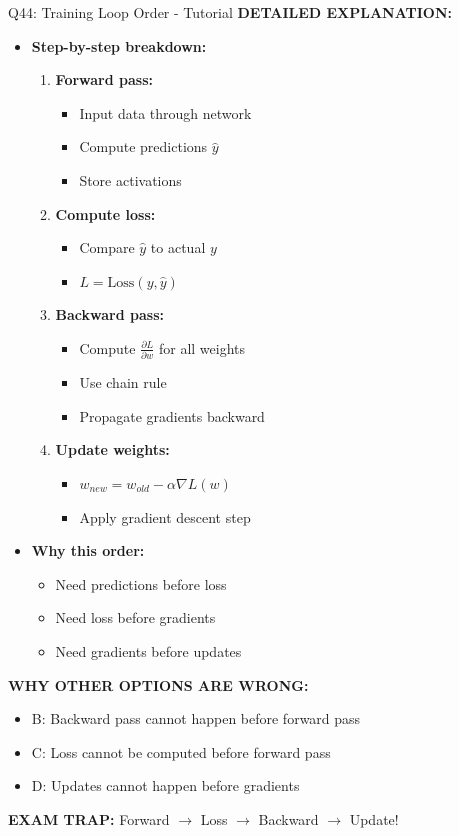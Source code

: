 \documentclass[8pt]{beamer}
\begin{document}
\begin{frame}{Q44: Training Loop Order - Tutorial}
		\vspace{0.05cm}
		\textbf{DETAILED EXPLANATION:}
		\begin{itemize}
			\item \textbf{Step-by-step breakdown:}
			\begin{enumerate}
				\item \textbf{Forward pass:}
				\begin{itemize}
					\item Input data through network
					\item Compute predictions $\hat{y}$
					\item Store activations
				\end{itemize}
				\item \textbf{Compute loss:}
				\begin{itemize}
					\item Compare $\hat{y}$ to actual $y$
					\item $L = \text{Loss}(y, \hat{y})$
				\end{itemize}
				\item \textbf{Backward pass:}
				\begin{itemize}
					\item Compute $\frac{\partial L}{\partial w}$ for all weights
					\item Use chain rule
					\item Propagate gradients backward
				\end{itemize}
				\item \textbf{Update weights:}
				\begin{itemize}
					\item $w_{new} = w_{old} - \alpha \nabla L(w)$
					\item Apply gradient descent step
				\end{itemize}
			\end{enumerate}
			\item \textbf{Why this order:}
			\begin{itemize}
				\item Need predictions before loss
				\item Need loss before gradients
				\item Need gradients before updates
			\end{itemize}
		\end{itemize}
		
		\vspace{0.05cm}
		\textcolor{myred}{\textbf{WHY OTHER OPTIONS ARE WRONG:}}
		\begin{itemize}
			\item \textcolor{myred}{B:} Backward pass cannot happen before forward pass
			\item \textcolor{myred}{C:} Loss cannot be computed before forward pass
			\item \textcolor{myred}{D:} Updates cannot happen before gradients
		\end{itemize}
		
		\textcolor{myred}{\textbf{EXAM TRAP:}} Forward $\to$ Loss $\to$ Backward $\to$ Update!
	\end{frame}
	
\end{document}
